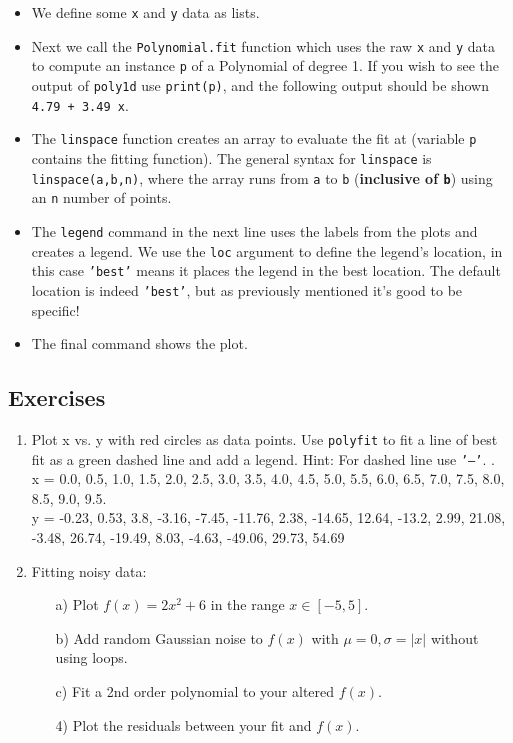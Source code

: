 \begin{itemize}


\item We define some \texttt{x} and \texttt{y} data as lists. 

\item Next we call the \texttt{Polynomial.fit} function which uses the raw \texttt{x} and \texttt{y} data to compute an instance {\tt p} of a Polynomial of degree 1.
If you wish to see the output of \texttt{poly1d} use \texttt{print(p)}, and the following output should be shown \texttt{4.79 + 3.49 x}.

\item The \texttt{linspace} function creates an array to evaluate the fit at (variable \texttt{p} contains the fitting function). The general syntax for \texttt{linspace} is \texttt{linspace(a,b,n)}, where the array runs from \texttt{a} to \texttt{b} (\textbf{inclusive of \texttt{b}}) using an \texttt{n} number of points. 

\item The \texttt{legend} command in the next line uses the labels from the plots and creates a legend. We use the \texttt{loc} argument to define the legend's location, in this case \texttt{'best'} means it places the legend in the best location. The default location is indeed \texttt{'best'}, but as previously mentioned it's good to be specific!

\item The final command shows the plot.

\end{itemize}

\subsection{Exercises}

\begin{enumerate}
    \item Plot x vs. y with red circles as data points. Use \texttt{polyfit} to fit a line of best fit as a green dashed line and add a legend. Hint: For dashed line use \texttt{\color{mygreen}'--'}. .\\ 
    x = 0.0, 0.5, 1.0, 1.5, 2.0, 2.5, 3.0, 3.5, 4.0, 4.5, 5.0, 5.5, 6.0, 6.5, 7.0, 7.5, 8.0, 8.5, 9.0, 9.5.\\ 
    y = -0.23, 0.53, 3.8, -3.16, -7.45, -11.76, 2.38, -14.65, 12.64, -13.2, 2.99, 21.08, -3.48, 26.74, -19.49, 8.03, -4.63, -49.06, 29.73, 54.69
    \item Fitting noisy data:
        \begin{enumerate}
            \item[a)] Plot $f(x)=2x^2+6$ in the range $x\in [-5,5]$. 
            \item[b)] Add random Gaussian noise to $f(x)$ with $\mu=0,\sigma=|x|$ without using loops.
            \item[c)] Fit a 2nd order polynomial to your altered $f(x)$.
            \item[4)] Plot the residuals between your fit and $f(x)$.
        \end{enumerate}
\end{enumerate}


